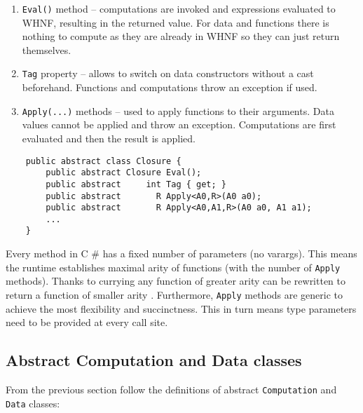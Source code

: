 \documentclass[en]{pracamgr}
\newcommand{\shrp}{%
  {\fontfamily{ppl}\selectfont\#%
  }}
\begin{document}
\begin{enumerate}
    \item \texttt{Eval()} method -- computations are
    invoked and expressions evaluated to WHNF, resulting in
    the returned value. For data and functions there is
    nothing to compute as they are already in WHNF so they
    can just return themselves.
    \item \texttt{Tag} property -- allows to switch on data
    constructors without a cast beforehand. Functions and
    computations throw an exception if used.
    \item \texttt{Apply(...)} methods -- used to apply
    functions to their arguments. Data values cannot be
    applied and throw an exception. Computations are first
    evaluated and then the result is applied.
\end{enumerate}

\begin{verbatim}
    public abstract class Closure {
        public abstract Closure Eval();
        public abstract     int Tag { get; }
        public abstract       R Apply<A0,R>(A0 a0);
        public abstract       R Apply<A0,A1,R>(A0 a0, A1 a1);
        ...
    }
\end{verbatim}

Every method in C\shrp{} has a fixed number of parameters (no varargs).
This means the runtime establishes maximal arity of functions
(with the number of \texttt{Apply} methods).
Thanks to currying any function of greater arity can be
rewritten to return a function of smaller arity \cite{Curry}.
Furthermore, \texttt{Apply} methods are generic to achieve
the most flexibility and succinctness.
This in turn means type parameters need to be provided at every call site.

\subsection{Abstract Computation and Data classes}

From the previous section follow the definitions of  abstract \texttt{Computation} and \texttt{Data} classes:
\end{document}
